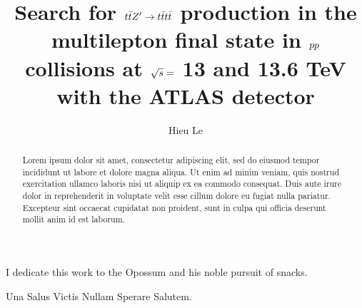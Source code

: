 \documentclass{msuphddissertation}
\author{Hieu Le} %
\title{Search for $\lowercase{\ttbar}Z' \rightarrow \lowercase{\tttt}$ production in the multilepton final state in $\lowercase{pp}$ collisions at \lowercase{$\sqrt{s}=$} 13 and 13.6 TeV with the ATLAS detector} %
\begin{document}
\maketitlepage %


\begin{abstract}
Lorem ipsum dolor sit amet, consectetur adipiscing elit, sed do eiusmod tempor incididunt ut labore et dolore magna aliqua. Ut enim ad minim veniam, quis nostrud exercitation ullamco laboris nisi ut aliquip ex ea commodo consequat. Duis aute irure dolor in reprehenderit in voluptate velit esse cillum dolore eu fugiat nulla pariatur. Excepteur sint occaecat cupidatat non proident, sunt in culpa qui officia deserunt mollit anim id est laborum.
\end{abstract}




\begin{dedication}
I dedicate this work to the Opossum and his noble pursuit of snacks.
\end{dedication}

\begin{acknowledgment}
Una Salus Victis Nullam Sperare Salutem.
\end{acknowledgment}
\end{document}
